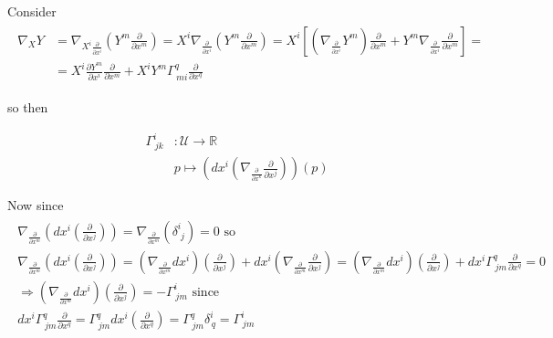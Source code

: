 Consider 
\[
\begin{gathered}
	\begin{aligned}
		\nabla_X Y & = \nabla_{X^i \frac{ \partial }{ \partial x^i} } \left(Y^m \frac{\partial }{ \partial x^m } \right) = X^i \nabla_{\frac{\partial}{\partial x^i} } \left( Y^m \frac{ \partial }{\partial x^m} \right) = X^i \left[ \left( \nabla_{\frac{ \partial }{ \partial x^i} } Y^m \right) \frac{\partial }{ \partial x^m} + Y^m \nabla_{\frac{\partial }{ \partial x^i} } \frac{\partial}{ \partial x^m} \right] = \\
		& = X^i \frac{\partial Y^m}{\partial x^i} \frac{\partial }{\partial x^m } + X^i Y^m  \Gamma^q_{ \, mi } \frac{\partial}{\partial x^q}
	\end{aligned}
\end{gathered}\]

so then

\begin{definition}
	\begin{equation}
		\begin{aligned}
			\Gamma^i_{\, jk} & : \mathcal{U} \to \mathbb{R} \\
			& p \mapsto ( dx^i \left( \nabla_{\frac{\partial}{\partial x^k} } \frac{\partial }{ \partial x^j} \right) )(p)
		\end{aligned}
	\end{equation}
\end{definition}

Now since
\[
\begin{gathered}
	\begin{gathered}
		\nabla_{\frac{\partial}{\partial x^m} } \left( dx^i \left( \frac{ \partial }{ \partial x^j} \right) \right) = \nabla_{\frac{\partial}{\partial x^m} } (\delta^i_{\, \, j} ) = 0 \text{ so } \\
		\nabla_{\frac{\partial}{\partial x^m} } \left( dx^i \left( \frac{ \partial }{ \partial x^j} \right) \right) = \left( \nabla_{\frac{\partial}{\partial x^m} } dx^i \right) \left( \frac{\partial }{ \partial x^j} \right) + dx^i \left( \nabla_{\frac{\partial}{\partial x^m} } \frac{\partial }{ \partial x^j} \right) = \left( \nabla_{\frac{\partial}{\partial x^m} } dx^i \right) \left( \frac{\partial }{ \partial x^j} \right) + dx^i \Gamma^q_{\, jm} \frac{ \partial }{ \partial x^q} = 0 \\
		\Longrightarrow \boxed{ \left( \nabla_{\frac{\partial}{\partial x^m} } dx^i \right) \left( \frac{\partial }{ \partial x^j} \right) = -\Gamma^i_{\, jm} } \text{ since } \\
		dx^i \Gamma^q_{\,  jm} \frac{\partial }{ \partial x^q} = \Gamma^q_{\, jm} dx^i \left( \frac{\partial }{ \partial x^q} \right) = \Gamma^q_{\, jm} \delta^i_{\, q} = \Gamma^i_{\, jm}
	\end{gathered}
\end{gathered}\]

